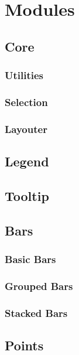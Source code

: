 \chapter{Modules}
\label{chap:Modules}

\section{Core}

\subsection{Utilities}
\subsection{Selection}
\subsection{Layouter}

\section{Legend}

\section{Tooltip}

\section{Bars}

\subsection{Basic Bars}

\subsection{Grouped Bars}

\subsection{Stacked Bars}

\section{Points}